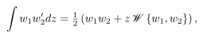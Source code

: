 \[\int w_{1}w^{\prime}_{2}dz=\tfrac{1}{2}\left(w_{1}w_{2}+z\mathop{\mathscr{W}\/%
}\nolimits\left\{w_{1},w_{2}\right\}\right),\]